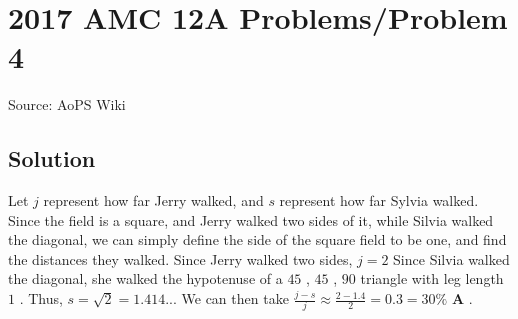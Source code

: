 \documentclass[12pt]{article}
\begin{document}
\section*{{2017 AMC 12A Problems/Problem 4}}
Source: AoPS Wiki

\subsection*{Solution}
Let $j$ represent how far Jerry walked, and $s$ represent how far Sylvia walked. Since the field is a square, and Jerry walked two sides of it, while Silvia walked the diagonal, we can simply define the side of the square field to be one, and find the distances they walked. Since Jerry walked two sides, $j = 2$ Since Silvia walked the diagonal, she walked the hypotenuse of a $45$ , $45$ , $90$ triangle with leg length $1$ . Thus, $s = \sqrt{2} = 1.414...$ We can then take $\frac{j-s}{j} \approx \frac{2 - 1.4}{2} = 0.3 = 30\%$ $\boxed{ \textbf{A}}$ .
\end{document}
